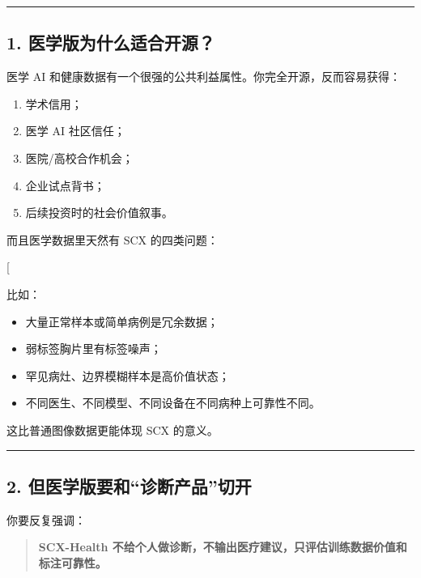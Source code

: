 \documentclass[
  12pt,
]{ctexart}
\providecommand{\tightlist}{%
  \setlength{\itemsep}{0pt}\setlength{\parskip}{0pt}}
\begin{document}
\begin{center}\rule{0.5\linewidth}{0.5pt}\end{center}

\subsection{1.
医学版为什么适合开源？}\label{ux533bux5b66ux7248ux4e3aux4ec0ux4e48ux9002ux5408ux5f00ux6e90}

医学 AI 和健康数据有一个很强的公共利益属性。你完全开源，反而容易获得：

\begin{enumerate}
\def\labelenumi{\arabic{enumi}.}
\tightlist
\item
  学术信用；
\item
  医学 AI 社区信任；
\item
  医院/高校合作机会；
\item
  企业试点背书；
\item
  后续投资时的社会价值叙事。
\end{enumerate}

而且医学数据里天然有 SCX 的四类问题：

{[} \text{valuable / redundant / noisy / expert-dependent}{]}

比如：

\begin{itemize}
\tightlist
\item
  大量正常样本或简单病例是冗余数据；
\item
  弱标签胸片里有标签噪声；
\item
  罕见病灶、边界模糊样本是高价值状态；
\item
  不同医生、不同模型、不同设备在不同病种上可靠性不同。
\end{itemize}

这比普通图像数据更能体现 SCX 的意义。

\begin{center}\rule{0.5\linewidth}{0.5pt}\end{center}

\subsection{2.
但医学版要和``诊断产品''切开}\label{ux4f46ux533bux5b66ux7248ux8981ux548cux8bcaux65adux4ea7ux54c1ux5207ux5f00}

你要反复强调：

\begin{quote}
\textbf{SCX-Health
不给个人做诊断，不输出医疗建议，只评估训练数据价值和标注可靠性。}
\end{quote}
\end{document}
